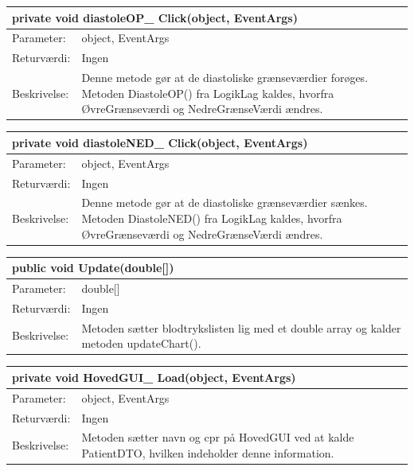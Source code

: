 \begin{table}[H]
\label{tab:tabel2}
\begin{tabular}{| l | p{13cm} |}
   \hline
   \multicolumn{2}{|l|}{private void diastoleOP\_ Click(object, EventArgs)} \\ \hline
   Parameter: & object, EventArgs\\ \hline
   Returværdi: & Ingen \\ \hline
   Beskrivelse: & Denne metode gør at de diastoliske grænseværdier forøges. Metoden DiastoleOP() fra LogikLag kaldes, hvorfra ØvreGrænseværdi og NedreGrænseVærdi ændres.\\ \hline
\end{tabular}
\end{table}
\begin{table}[H]
\label{tab:tabel2}
\begin{tabular}{| l | p{13cm} |}
   \hline
   \multicolumn{2}{|l|}{private void diastoleNED\_ Click(object, EventArgs)} \\ \hline
   Parameter: & object, EventArgs\\ \hline
   Returværdi: & Ingen \\ \hline
   Beskrivelse: &  Denne metode gør at de diastoliske grænseværdier sænkes. Metoden DiastoleNED() fra LogikLag kaldes, hvorfra ØvreGrænseværdi og NedreGrænseVærdi ændres.\\ \hline
\end{tabular}
\end{table}
\begin{table}[H]
\label{tab:tabel2}
\begin{tabular}{| l | p{13cm} |}
   \hline
   \multicolumn{2}{|l|}{public void Update(double[])} \\ \hline
   Parameter: & double[]\\ \hline
   Returværdi: & Ingen \\ \hline
   Beskrivelse: & Metoden sætter blodtrykslisten lig med et double array og kalder metoden updateChart().\\ \hline
\end{tabular}
\end{table}
\begin{table}[H]
\label{tab:tabel2}
\begin{tabular}{| l | p{13cm} |}
   \hline
   \multicolumn{2}{|l|}{private void HovedGUI\_ Load(object, EventArgs)} \\ \hline
   Parameter: & object, EventArgs\\ \hline
   Returværdi: & Ingen \\ \hline
   Beskrivelse: & Metoden sætter navn og cpr på HovedGUI ved at kalde PatientDTO, hvilken indeholder denne information.\\ \hline
\end{tabular}
\end{table}

